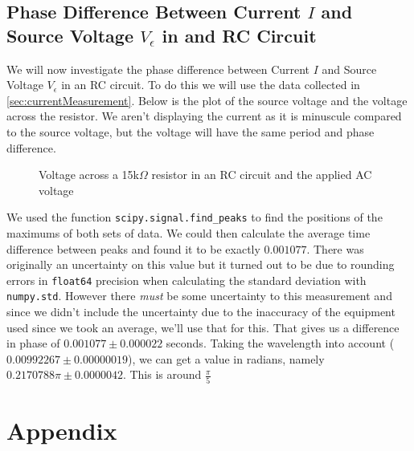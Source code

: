 \documentclass[12pt]{article}
\numberwithin{equation}{section}
\numberwithin{figure}{section}
\begin{document}
    \subsection{Phase Difference Between Current \texorpdfstring{$I$}{I} and Source Voltage \texorpdfstring{$V_\epsilon$}{Ve} in and RC Circuit}\label{sec:current}
    We will now investigate the phase difference between Current $I$ and Source Voltage $V_\epsilon$ in an RC 
    circuit. To do this we will use the data collected in \autoref{sec:currentMeasurement}. Below is the plot 
    of the source voltage and the voltage across the resistor. We aren't displaying the current as it is 
    minuscule compared to the source voltage, but the voltage will have the same period and phase difference.
    \begin{figure}[H]
        \begin{center}
           \caption{Voltage across a 15k$\Omega$ resistor in an RC circuit and the applied AC voltage}
           \label{fig:CurrentPhaseDiff}
        \end{center}
    \end{figure}
    We used the function \texttt{scipy.signal.find\_peaks} to find the positions of the maximums of both 
    sets of data. We could then calculate the average time difference between peaks and found it to be 
    exactly $0.001077$. There was originally an uncertainty on this value but it turned out to be 
    due to rounding errors in \texttt{float64} precision when calculating the standard deviation 
    with \texttt{numpy.std}. However there \textit{must} be some uncertainty to this measurement and since 
    we didn't include the uncertainty due to the inaccuracy of the equipment used since we took an average, 
    we'll use that for this. That gives us a difference in phase of $0.001077\pm 0.000022$ seconds. Taking 
    the wavelength into account ($0.00992267\pm 0.00000019$), we can get a value in radians, namely 
    $0.2170788\pi \pm 0.0000042$. This is around $\frac{\pi}{5}$
    


    \newpage
    \section{Appendix}
    \setcounter{figure}{0} \renewcommand{\thefigure}{A.\arabic{figure}}
    
\end{document}
